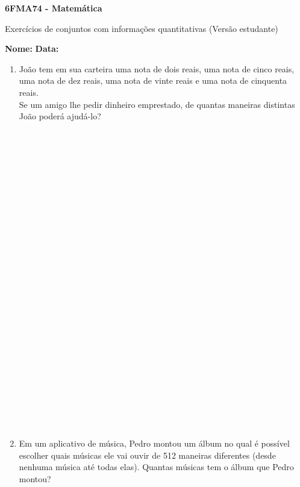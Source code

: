 \documentclass[a4paper,14pt]{article}
\begin{document}
	
	\noindent\textbf{6FMA74 - Matemática} 
	
	\begin{center}Exercícios de conjuntos com informações quantitativas (Versão estudante)
	\end{center}
	
	\noindent\textbf{Nome:} \underline{\hspace{10cm}}
	\noindent\textbf{Data:} \underline{\hspace{4cm}}
	
	
	\begin{multicols}{2}
    	\begin{enumerate}
   			\item João tem em sua carteira uma nota de dois reais, uma nota de cinco reais, uma nota de dez reais, uma nota de vinte reais e uma nota de cinquenta reais. \\
   			Se um amigo lhe pedir dinheiro emprestado, de quantas maneiras distintas João poderá ajudá-lo? \\\\\\\\\\\\\\\\\\\\\\\\\\\\\\\\\\\\\\\\\\\\\\\\\\\\\\
   			\item Em um aplicativo de música, Pedro montou um álbum no qual é possível escolher quais músicas ele vai ouvir de 512 maneiras diferentes (desde nenhuma música até todas elas). Quantas músicas tem o álbum que Pedro montou? \newpage

\end{enumerate}
\end{multicols}
\end{document}
